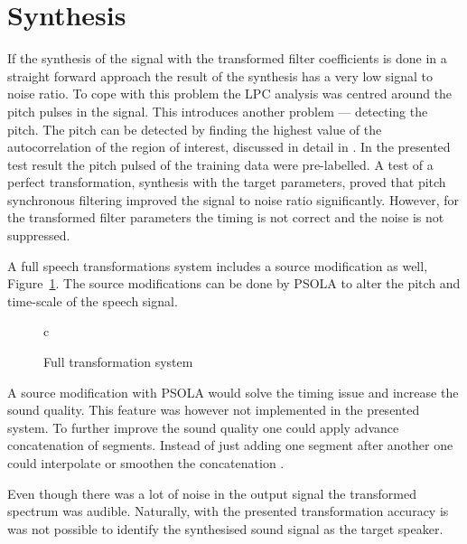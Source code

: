 \section{Synthesis} %
\label{sec:synthesis}
If the synthesis of the signal with the transformed filter coefficients is done in a straight forward approach the result of the synthesis has a very low signal to noise ratio. To cope with this problem the LPC analysis was centred around the pitch pulses in the signal. This introduces another problem --- detecting the pitch. The pitch can be detected by finding the highest value of the autocorrelation of the region of interest, discussed in detail in \cite[p. 324]{taletek}. In the presented test result the pitch pulsed of the training data were pre-labelled. A test of a perfect transformation, \ie synthesis with the target parameters, proved that pitch synchronous filtering improved the signal to noise ratio significantly. However, for the transformed filter parameters the timing is not correct and the noise is not suppressed.

A full speech transformations system includes a source modification as well, Figure~\ref{fig:VC_full}. The source modifications can be done by PSOLA \cite[p.820]{taletek} to alter the pitch and time-scale  of the speech signal.
\begin{figure}[htbp]
  \centering
   \begin{tabular}[h]{c}
  \end{tabular}
  \caption{Full transformation system}
  \label{fig:VC_full}
\end{figure}
A source modification with PSOLA would solve the timing issue and increase the sound quality. This feature was however not implemented in the presented system. To further improve the sound quality one could apply advance concatenation of segments. Instead of just adding one segment after another one could interpolate or smoothen the concatenation \cite{chappell02}.

Even though there was a lot of noise in the output signal the transformed spectrum was audible. Naturally, with the presented transformation accuracy is was not possible to identify the synthesised sound signal as the target speaker.


